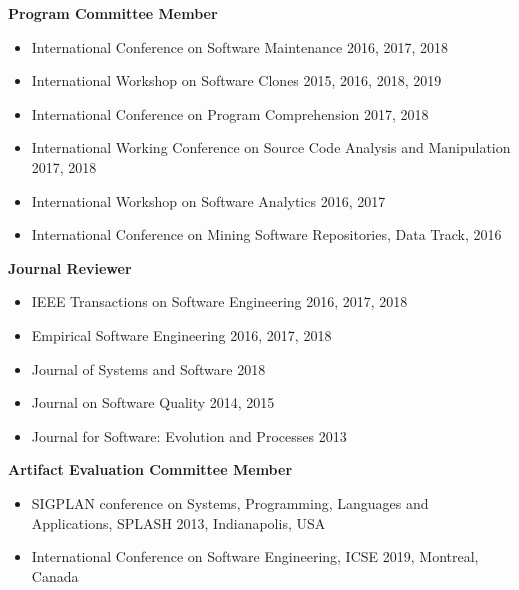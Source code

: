 \documentclass[letterpaper,11pt]{article}
\begin{document}
\textbf{Program Committee Member}


\begin{itemize}

  \vspace{-1pt}\item\small{International Conference on Software Maintenance 2016, 2017, 2018}
  \vspace{-1pt}\item\small{International Workshop on Software Clones 2015, 2016, 2018, 2019}
  \vspace{-1pt}\item\small{International Conference on Program Comprehension 2017, 2018}
  \vspace{-1pt}\item\small{ International Working Conference on Source Code Analysis and Manipulation 2017, 2018}
  \vspace{-1pt}\item\small{ International Workshop on Software Analytics 2016, 2017}
   \vspace{-1pt}\item\small{International Conference on Mining Software Repositories, Data Track, 2016}

\end{itemize}

\textbf{Journal Reviewer}

\begin{itemize}

  \vspace{-1pt}\item\small{IEEE Transactions on Software Engineering 2016, 2017, 2018}
  \vspace{-1pt}\item\small{Empirical Software Engineering 2016, 2017, 2018}
  \vspace{-1pt}\item\small{Journal of Systems and Software 2018}
  \vspace{-1pt}\item\small{Journal on Software Quality 2014, 2015}
  \vspace{-1pt}\item\small{Journal for Software: Evolution and Processes 2013}

\end{itemize}

\textbf{Artifact Evaluation Committee Member}

\begin{itemize}
  \vspace{-1pt}\item\small{SIGPLAN conference on Systems, Programming, Languages and Applications, SPLASH 2013,
Indianapolis, USA}
  \vspace{-1pt}\item\small{International Conference on Software Engineering, ICSE 2019,
Montreal, Canada}

\end{itemize}
\end{document}
